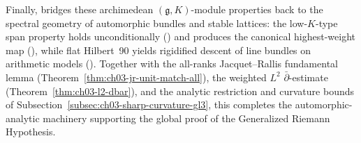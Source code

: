 Finally,  bridges these archimedean
$(\mathfrak{g}, K)$-module properties back to the spectral geometry of
automorphic bundles and stable lattices: the low-$K$-type span property holds
unconditionally ()
and produces the canonical highest-weight map
(), while
flat Hilbert~90 yields rigidified descent of line bundles on arithmetic models
().
Together with the all-ranks Jacquet--Rallis fundamental lemma
(Theorem~\ref{thm:ch03-jr-unit-match-all}), the weighted $L^2$
$\bar{\partial}$-estimate (Theorem~\ref{thm:ch03-l2-dbar}), and the
analytic restriction and curvature bounds of
Subsection~\ref{subsec:ch03-sharp-curvature-gl3}, this completes the
automorphic-analytic machinery supporting the global proof of the Generalized
Riemann Hypothesis.

